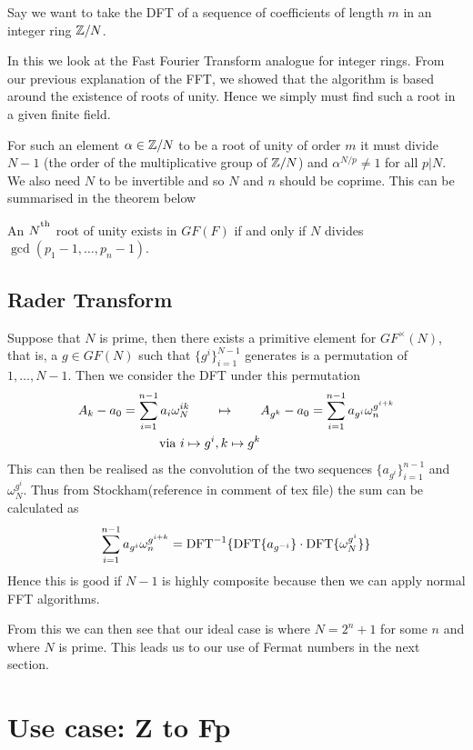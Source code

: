 Say we want to take the DFT of a sequence of coefficients of length $m$ in an integer ring ${\mathbb Z}/N$.

In this we look at the Fast Fourier Transform analogue for integer rings. From our previous explanation of the FFT, we showed that the algorithm is based around the existence of roots of unity. Hence we simply must find such a root in a given finite field.

For such an element $\alpha \in {\mathbb Z}/N$ to be a root of unity of order $m$ it must divide $N - 1$ (the order of the multiplicative group of ${\mathbb Z}/N$) and $\alpha^{N/p} \neq 1$ for all $p | N$. We also need $N$ to be invertible and so $N$ and $n$ should be coprime. This can be summarised in the theorem below

\begin{theorem}
  An $N^\textsuperscript{\textup{th}}$ root of unity exists in $GF(F)$ if and only if $N$ divides $\gcd(p_1 - 1, \ldots, p_n - 1)$.
\end{theorem}


\subsection{Rader Transform}
\label{subsec:rt}



Suppose that $N$ is prime, then there exists a primitive element for $GF^\times(N)$, that is, a $g \in GF(N)$ such that $\{g^i\}_{i=1}^{N-1}$ generates is a permutation of $1, \ldots, N-1$. Then we consider the DFT under this permutation
\begin{align*}
  A_k - a_0 = \sum^{n-1}_{i=1} a_i \omega_N^{ik} \qquad &\mapsto \qquad A_{g^k} - a_0 = \sum^{n-1}_{i=1} a_{g^i}\omega_n^{g^{i+k}}\\
  \textrm{ via } i \mapsto g^i&, k \mapsto g^k
\end{align*}
This can then be realised as the convolution of the two sequences $\{a_{g^i}\}_{i=1}^{n-1}$ and $\omega_N^{g^i}$. Thus from Stockham(reference in comment of tex file) the sum can be calculated as
\[
  \sum^{n-1}_{i=1} a_{g^i}\omega_n^{g^{i+k}} = \textrm{DFT}^{-1}\{\textrm{DFT}\{a_{g^{-i}}\}\cdot \textrm{DFT}\{\omega_N^{g^i}\}\}
\]
Hence this is good if $N - 1$ is highly composite because then we can apply normal FFT algorithms.

From this we can then see that our ideal case is where $N = 2^n + 1$ for some $n$ and where $N$ is prime. This leads us to our use of Fermat numbers in the next section.

\section{Use case: Z to Fp}\label{sec:Z-Fp}

